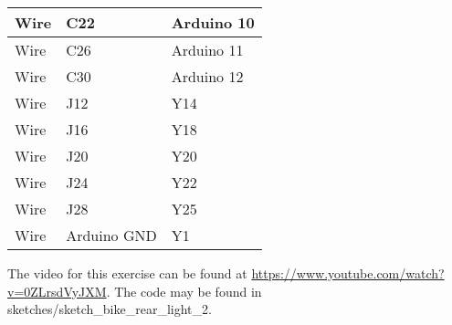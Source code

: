 \begin{table}[H]
\begin{tabular}{|l|l|l|}
		Wire             & C22         & Arduino 10 \\ \hline
		Wire             & C26         & Arduino 11 \\ \hline
		Wire             & C30         & Arduino 12 \\ \hline
		Wire             & J12         & Y14        \\ \hline
		Wire             & J16         & Y18        \\ \hline
		Wire             & J20         & Y20        \\ \hline
		Wire             & J24         & Y22        \\ \hline
		Wire             & J28         & Y25        \\ \hline
		Wire             & Arduino GND & Y1         \\ \hline
	\end{tabular}
\end{table}
The video for this exercise can be found at \url{https://www.youtube.com/watch?v=0ZLrsdVyJXM}. The code may be found in sketches/sketch\_bike\_rear\_light\_2.